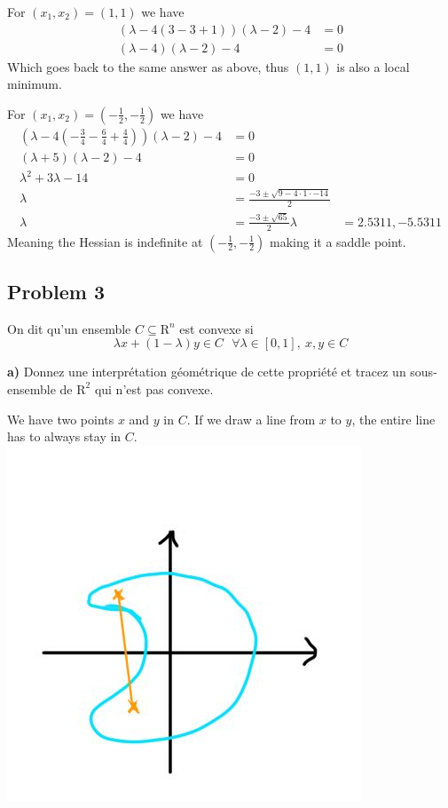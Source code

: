 For $(x_1, x_2) = (1,1)$ we have
\begin{align*}
(\lambda-4(3-3+1))(\lambda -2 ) -4 &= 0 \\
(\lambda -4)(\lambda -2) -4 &= 0
\end{align*}
Which goes back to the same answer as above, thus $(1,1)$ is also a local minimum.

For $(x_1, x_2) = (-\frac{1}{2},-\frac{1}{2})$ we have
\begin{align*}
(\lambda-4(-\frac{3}{4} - \frac{6}{4} + \frac{4}{4}))(\lambda -2 ) -4 &= 0 \\
(\lambda +5)(\lambda -2) -4 &= 0 \\
\lambda^2 + 3 \lambda -14 &= 0 \\
\lambda &= \frac{-3 \pm \sqrt{9-4 \cdot 1 \cdot -14}}{2} \\
\lambda &= \frac{-3 \pm \sqrt{65}}{2}
\lambda &= 2.5311, -5.5311
\end{align*}
Meaning the Hessian is indefinite at $(-\frac{1}{2},-\frac{1}{2})$ making it a saddle point.

\subsection{Problem 3}

On dit qu’un ensemble $C \subseteq \mathrm{R}^n$ est convexe si
\[
	\lambda x+(1-\lambda )y \in C\ \ \ \forall \lambda \in [0,1],\ x, y \in C
\]

\textbf{a)} Donnez une interprétation géométrique de cette propriété et tracez un sous-ensemble de $\mathrm{R}^2$ qui n’est pas convexe.

\answer

We have two points $x$ and $y$ in $C$. If we draw a line from $x$ to $y$, the entire line has to always stay in $C$.
\includegraphics[scale=0.5]{fig/unconstrained_exercices/pb3a.jpg}

